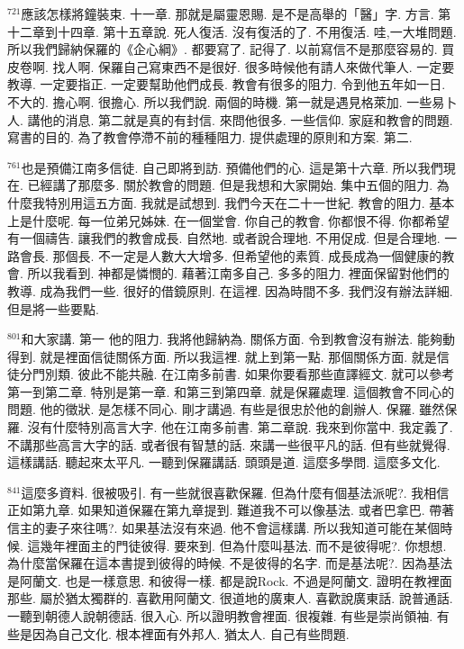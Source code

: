 \documentclass{book}
\begin{document}
$^{721}$應該怎樣將鐘裝束.
十一章.
那就是屬靈恩賜.
是不是高舉的「醫」字.
方言.
第十二章到十四章.
第十五章說.
死人復活.
沒有復活的了.
不用復活.
哇,一大堆問題.
所以我們歸納保羅的《企心綱》.
都要寫了.
記得了.
以前寫信不是那麼容易的.
買皮卷啊.
找人啊.
保羅自己寫東西不是很好.
很多時候他有請人來做代筆人.
一定要教導.
一定要指正.
一定要幫助他們成長.
教會有很多的阻力.
令到他五年如一日.
不大的.
擔心啊.
很擔心.
所以我們說.
兩個的時機.
第一就是遇見格萊加.
一些易卜人.
講他的消息.
第二就是真的有封信.
來問他很多.
一些信仰.
家庭和教會的問題.
寫書的目的.
為了教會停滯不前的種種阻力.
提供處理的原則和方案.
第二.

$^{761}$也是預備江南多信徒.
自己即將到訪.
預備他們的心.
這是第十六章.
所以我們現在.
已經講了那麼多.
關於教會的問題.
但是我想和大家開始.
集中五個的阻力.
為什麼我特別用這五方面.
我就是試想到.
我們今天在二十一世紀.
教會的阻力.
基本上是什麼呢.
每一位弟兄姊妹.
在一個堂會.
你自己的教會.
你都恨不得.
你都希望有一個禱告.
讓我們的教會成長.
自然地.
或者說合理地.
不用促成.
但是合理地.
一路會長.
那個長.
不一定是人數大大增多.
但希望他的素質.
成長成為一個健康的教會.
所以我看到.
神都是憐憫的.
藉著江南多自己.
多多的阻力.
裡面保留對他們的教導.
成為我們一些.
很好的借鏡原則.
在這裡.
因為時間不多.
我們沒有辦法詳細.
但是將一些要點.

$^{801}$和大家講.
第一 他的阻力.
我將他歸納為.
關係方面.
令到教會沒有辦法.
能夠動得到.
就是裡面信徒關係方面.
所以我這裡.
就上到第一點.
那個關係方面.
就是信徒分門別類.
彼此不能共融.
在江南多前書.
如果你要看那些直譯經文.
就可以參考第一到第二章.
特別是第一章.
和第三到第四章.
就是保羅處理.
這個教會不同心的問題.
他的徵狀.
是怎樣不同心.
剛才講過.
有些是很忠於他的創辦人.
保羅.
雖然保羅.
沒有什麼特別高言大字.
他在江南多前書.
第二章說.
我來到你當中.
我定義了.
不講那些高言大字的話.
或者很有智慧的話.
來講一些很平凡的話.
但有些就覺得.
這樣講話.
聽起來太平凡.
一聽到保羅講話.
頭頭是道.
這麼多學問.
這麼多文化.

$^{841}$這麼多資料.
很被吸引.
有一些就很喜歡保羅.
但為什麼有個基法派呢?.
我相信正如第九章.
如果知道保羅在第九章提到.
難道我不可以像基法.
或者巴拿巴.
帶著信主的妻子來往嗎?.
如果基法沒有來過.
他不會這樣講.
所以我知道可能在某個時候.
這幾年裡面主的門徒彼得.
要來到.
但為什麼叫基法.
而不是彼得呢?.
你想想.
為什麼當保羅在這本書提到彼得的時候.
不是彼得的名字.
而是基法呢?.
因為基法是阿蘭文.
也是一樣意思.
和彼得一樣.
都是說Rock.
不過是阿蘭文.
證明在教裡面那些.
屬於猶太獨群的.
喜歡用阿蘭文.
很道地的廣東人.
喜歡說廣東話.
說普通話.
一聽到朝德人說朝德話.
很入心.
所以證明教會裡面.
很複雜.
有些是崇尚領袖.
有些是因為自己文化.
根本裡面有外邦人.
猶太人.
自己有些問題.
\end{document}
